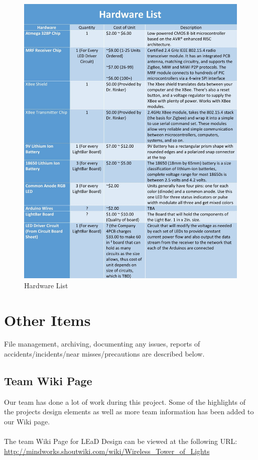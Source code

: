 \documentclass[12pt]{article}
\begin{document}
{{{{{{{{			\begin{figure}[ht!]
				\centering
				\includegraphics[width=170mm]{assets/HardwareList.jpg}
				\caption{Hardware List \label{overflow}}
			\end{figure}
			
			\newpage

\section{Other Items}
	File management, archiving, documenting any issues, reports of accidents/incidents/near misses/precautions are described below.
	
	\subsection{Team Wiki Page}
	Our team has done a lot of work during this project. Some of the highlights of the projects design elements as well as more team information has been added to our Wiki page.
	\\
	\\
	The team Wiki Page for LEaD Design can be viewed at the following URL: \\
	\url{http://mindworks.shoutwiki.com/wiki/Wireless_Tower_of_Lights}
	
}}}}}}}}
\end{document}
